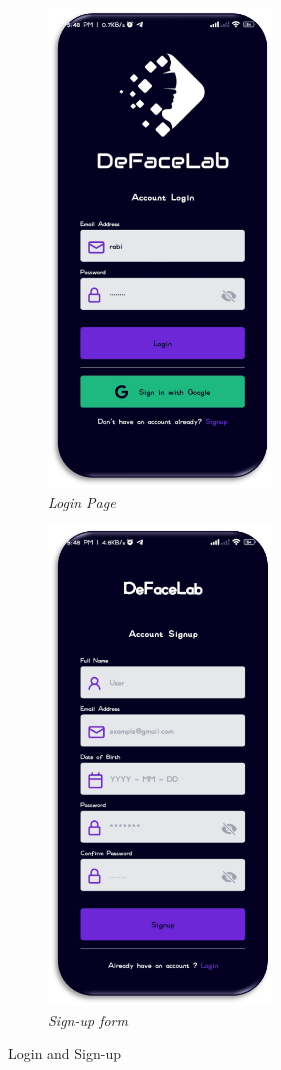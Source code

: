 \begin{figure}[ht]
    \centering
    \begin{subfigure}[b]{0.45\textwidth}
        \centering
        \includegraphics[height=5in]{img/loginv3.png}
        \caption{\textit{Login Page}}
    \end{subfigure}
    \hfill
    \begin{subfigure}[b]{0.45\textwidth}
        \centering
        \includegraphics[height=5in]{img/signup.png}
        \caption{\textit{Sign-up form}}
    \end{subfigure}
    \caption{Login and Sign-up}
\end{figure}

